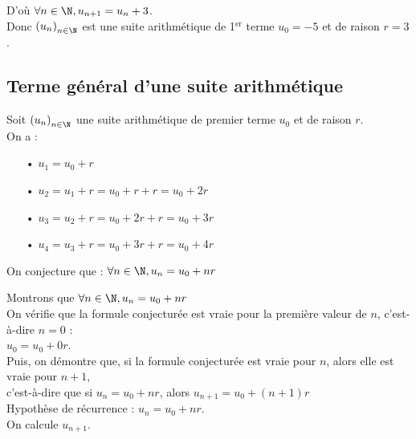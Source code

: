 \vspace*{.3cm}

D'où $\forall n \in \N, u_{n+1} = u_n + 3$. \\

Donc $\left(u_n\right)_{n \in \N}$ est une suite arithmétique de 1$^{\mathrm{er}}$ terme $u_0 = -5$ et de raison $r = 3$. 

\subsection{Terme général d'une suite arithmétique}

Soit $\left(u_n\right)_{n \in \N}$ une suite arithmétique de premier terme $u_0$ et de raison $r$. \\

On a :

\begin{itemize}
\item[•] $u_1 = u_0 + r$
\item[•] $u_2 = u_1 + r = u_0 + r + r = u_0 + 2r$
\item[•] $u_3 = u_2 + r = u_0 + 2r + r = u_0 + 3r$
\item[•] $u_4 = u_3 + r = u_0 + 3r + r = u_0 + 4r$
\end{itemize}

\vspace*{.3cm}

On conjecture que : $\forall n \in \N, u_n = u_0 + nr$ \\

\newpage

Montrons que $\forall n \in \N, u_n = u_0 + nr$ \\

On vérifie que la formule conjecturée est vraie pour la première valeur de $n$, c'est-à-dire $n = 0$ : \\

$u_0 = u_0 + 0r$. \\

Puis, on démontre que, si la formule conjecturée est vraie pour $n$, alors elle est vraie pour $n+1$, \\ c'est-à-dire que si $u_n = u_0 + nr$, alors $u_{n+1} = u_0 + \left(n+1\right)r$ \\

Hypothèse de récurrence : $u_n = u_0 + nr$. \\

On calcule $u_{n+1}$. \\

